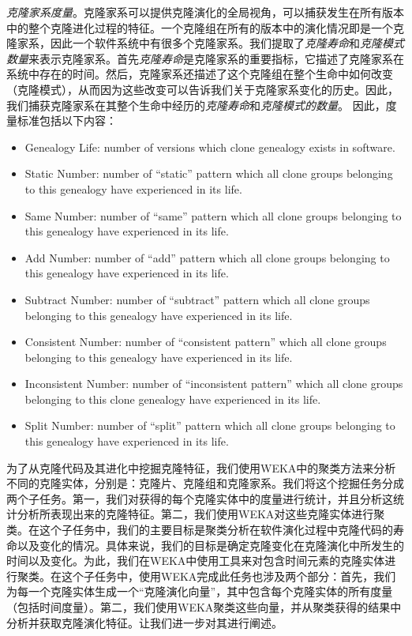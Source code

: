 {\em 克隆家系度量}。克隆家系可以提供克隆演化的全局视角，可以捕获发生在所有版本中的整个克隆进化过程的特征。一个克隆组在所有的版本中的演化情况即是一个克隆家系，因此一个软件系统中有很多个克隆家系。我们提取了{\em  克隆寿命}和{\em 克隆模式数量}来表示克隆家系。首先{\em 克隆寿命}是克隆家系的重要指标，它描述了克隆家系在系统中存在的时间。然后，克隆家系还描述了这个克隆组在整个生命中如何改变（克隆模式），从而因为这些改变可以告诉我们关于克隆家系变化的历史。因此，我们捕获克隆家系在其整个生命中经历的{\em 克隆寿命}和{\em 克隆模式的数量}。 因此，度量标准包括以下内容：
\begin{itemize}
\item Genealogy  Life: number of versions which clone genealogy exists in software.
\item Static Number: number of ``static'' pattern which all clone groups belonging to this genealogy have experienced in its life.
\item Same Number: number of ``same'' pattern which all clone groups belonging to this genealogy have experienced in its life.
\item Add Number: number of ``add'' pattern which all clone groups belonging to this genealogy have experienced  in its life.
\item Subtract Number: number of ``subtract'' pattern which all clone groups belonging to this genealogy have experienced in its life.
\item Consistent Number: number of ``consistent pattern'' which all clone groups belonging to this genealogy have experienced in its life.
\item Inconsistent Number: number of ``inconsistent pattern'' which all clone groups belonging to this clone genealogy have experienced in its life.
\item Split Number: number of ``split'' pattern which all clone groups belonging to this genealogy have experienced in its life.
\end{itemize}


为了从克隆代码及其进化中挖掘克隆特征，我们使用WEKA中的聚类方法来分析不同的克隆实体，分别是：克隆片、克隆组和克隆家系。我们将这个挖掘任务分成两个子任务。第一，我们对获得的每个克隆实体中的度量进行统计，并且分析这统计分析所表现出来的克隆特征。第二，我们使用WEKA对这些克隆实体进行聚类。在这个子任务中，我们的主要目标是聚类分析在软件演化过程中克隆代码的寿命以及变化的情况。具体来说，我们的目标是确定克隆变化在克隆演化中所发生的时间以及变化。为此，我们在WEKA中使用工具来对包含时间元素的克隆实体进行聚类。在这个子任务中，使用WEKA完成此任务也涉及两个部分：首先，我们为每一个克隆实体生成一个“克隆演化向量”，其中包含每个克隆实体的所有度量（包括时间度量）。第二，我们使用WEKA聚类这些向量，并从聚类获得的结果中分析并获取克隆演化特征。让我们进一步对其进行阐述。

